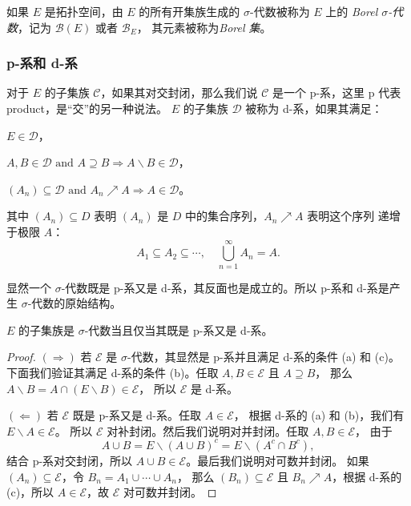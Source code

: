 \documentclass[fontset=none]{Notes}
\begin{document}
如果 $E$ 是拓扑空间，由 $E$ 的所有开集族生成的 $\sigma$-代数被称为 $E$ 上的
\emph{Borel $\sigma$-代数}，记为 $\mathcal{B}(E)$ 或者 $\mathcal{B}_E$，
其元素被称为\emph{Borel 集}。

\subsubsection{p-系和 d-系}

对于 $E$ 的子集族 $\mathcal{C}$，如果其对交封闭，那么我们说 $\mathcal{C}$
是一个 p-系，这里 p 代表 product，是“交”的另一种说法。
$E$ 的子集族 $\mathcal{D}$ 被称为 d-系，如果其满足：
\begin{alphenum}
  \item $E\in\mathcal{D}$，
  \item $\text{$A,B\in \mathcal{D}$ and $A\supseteq B\Rightarrow A \smallsetminus B\in \mathcal{D}$}$，
  \item $\text{$(A_n)\subseteq \mathcal{D}$ and $A_n\nearrow A\Rightarrow A\in \mathcal{D}$}$。
\end{alphenum}
其中 $(A_n)\subseteq D$ 表明 $(A_n)$ 是 $D$ 中的集合序列，$A_n\nearrow A$ 表明这个序列
递增于极限 $A$：
\[
  A_1\subseteq A_2\subseteq\cdots,\quad \bigcup_{n=1}^\infty A_n=A.
\]

显然一个 $\sigma$-代数既是 p-系又是 d-系，其反面也是成立的。所以 p-系和 d-系是产生
$\sigma$-代数的原始结构。

\begin{proposition}\label{prop:equivalent condition of sigma algebra}
  $E$ 的子集族是 $\sigma$-代数当且仅当其既是 p-系又是 d-系。
\end{proposition}
\begin{proof}
  $(\Rightarrow)$ 若 $\mathcal{E}$ 是 $\sigma$-代数，其显然是 p-系并且满足 d-系的条件 (a) 和 (c)。
  下面我们验证其满足 d-系的条件 (b)。任取 $A,B\in\mathcal{E}$ 且 $A\supseteq B$，
  那么 $A \smallsetminus B=A\cap (E \smallsetminus B)\in \mathcal{E}$，
  所以 $\mathcal{E}$ 是 d-系。

  $(\Leftarrow)$ 若 $\mathcal{E}$ 既是 p-系又是 d-系。任取 $A\in \mathcal{E}$，
  根据 d-系的 (a) 和 (b)，我们有 $E \smallsetminus A\in \mathcal{E}$。
  所以 $\mathcal{E}$ 对补封闭。然后我们说明对并封闭。任取 $A,B\in \mathcal{E}$， 
  由于
  \[
    A\cup B=E \smallsetminus (A\cup B)^c=E \smallsetminus (A^c\cap B^c),
  \]
  结合 p-系对交封闭，所以 $A\cup B\in \mathcal{E}$。最后我们说明对可数并封闭。
  如果 $(A_n)\subseteq \mathcal{E}$，令 $B_n=A_1\cup\cdots\cup A_n$，
  那么 $(B_n)\subseteq \mathcal{E}$ 且 $B_n\nearrow A$，根据 d-系的 (c)，所以
  $A\in \mathcal{E}$，故 $\mathcal{E}$ 对可数并封闭。
\end{proof}
\end{document}

